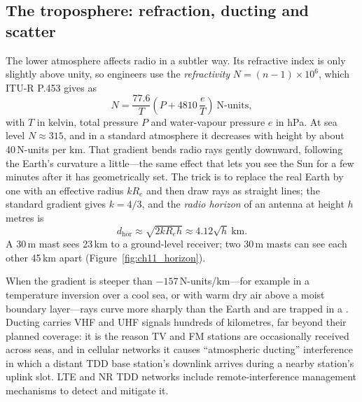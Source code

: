 
\subsection{The troposphere: refraction, ducting and scatter}

The lower atmosphere affects radio in a subtler way. Its refractive index is only slightly above
unity, so engineers use the \emph{refractivity} $N=(n-1)\times10^6$, which ITU-R P.453 gives as
\begin{equation}
N=\frac{77.6}{T}\left(P+4810\,\frac{e}{T}\right)\ \text{N-units},
\end{equation}
with $T$ in kelvin, total pressure $P$ and water-vapour pressure $e$ in hPa. At sea level
$N\approx315$, and in a standard atmosphere it decreases with height by about 40\,N-units per km.
That gradient bends radio rays gently downward, following the Earth's curvature a little---the
same effect that lets you see the Sun for a few minutes after it has geometrically set. The trick
is to replace the real Earth by one with an effective radius $kR_e$ and then draw rays as
straight lines; the standard gradient gives $k=4/3$, and the \emph{radio horizon} of an antenna at
height $h$ metres is
\begin{equation}
d_{\text{hor}}\approx\sqrt{2kR_eh}\approx4.12\sqrt{h}\ \text{km}.
\end{equation}
A 30\,m mast sees 23\,km to a ground-level receiver; two 30\,m masts can see each other 45\,km apart
(Figure~\ref{fig:ch11_horizon}).


When the gradient is steeper than $-157$\,N-units/km---for example in a temperature inversion
over a cool sea, or with warm dry air above a moist boundary layer---rays curve more sharply than
the Earth and are trapped in a . Ducting carries VHF and UHF signals hundreds of
kilometres, far beyond their planned coverage: it is the reason TV and FM stations are
occasionally received across seas, and in cellular networks it causes ``atmospheric ducting''
interference in which a distant TDD base station's downlink arrives during a nearby station's
uplink slot. LTE and NR TDD networks include remote-interference management mechanisms to detect
and mitigate it.

